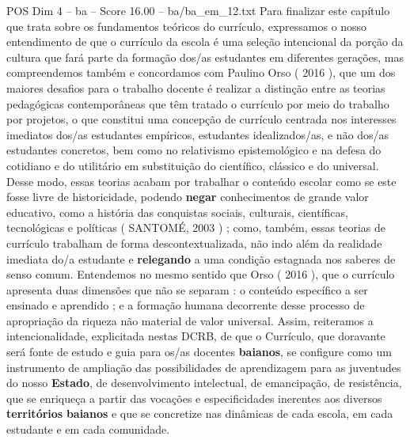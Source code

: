 \begin{textsample}{POS Dim 4 – ba – Score 16.00 – ba/ba\_em\_12.txt}
Para finalizar este capítulo que trata sobre os fundamentos teóricos do currículo, expressamos o nosso entendimento de que o currículo da escola é uma seleção intencional da porção da cultura que fará parte da formação dos/as estudantes em diferentes gerações, mas compreendemos também e concordamos com Paulino Orso ( 2016 ), que um dos maiores desafios para o trabalho docente é realizar a distinção entre as teorias pedagógicas contemporâneas que têm tratado o currículo por meio do trabalho por projetos, o que constitui uma concepção de currículo centrada nos interesses imediatos dos/as estudantes empíricos, estudantes idealizados/as, e não dos/as estudantes concretos, bem como no relativismo epistemológico e na defesa do cotidiano e do utilitário em substituição do científico, clássico e do universal.
Desse modo, essas teorias acabam por trabalhar o conteúdo escolar como se este fosse livre de historicidade, podendo \textbf{negar} conhecimentos de grande valor educativo, como a história das conquistas sociais, culturais, científicas, tecnológicas e políticas ( SANTOMÉ, 2003 ) ; como, também, essas teorias de currículo trabalham de forma descontextualizada, não indo além da realidade imediata do/a estudante e \textbf{relegando} a uma condição estagnada nos saberes de senso comum.
Entendemos no mesmo sentido que Orso ( 2016 ), que o currículo apresenta duas dimensões que não se separam : o conteúdo específico a ser ensinado e aprendido ; e a formação humana decorrente desse processo de apropriação da riqueza não material de valor universal.
Assim, reiteramos a intencionalidade, explicitada nestas DCRB, de que o Currículo, que doravante será fonte de estudo e guia para os/as docentes \textbf{baianos}, se configure como um instrumento de ampliação das possibilidades de aprendizagem para as juventudes do nosso \textbf{Estado}, de desenvolvimento intelectual, de emancipação, de resistência, que se enriqueça a partir das vocações e especificidades inerentes aos diversos \textbf{territórios} \textbf{baianos} e que se concretize nas dinâmicas de cada escola, em cada estudante e em cada comunidade.

\end{textsample}
